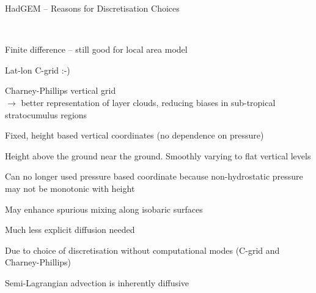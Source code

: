 \begin{slide}{HadGEM -- Reasons for Discretisation Choices}

\ \\
\begin{list1}

\item Finite difference -- still good for local area model

\item Lat-lon C-grid :-)

\item Charney-Phillips vertical grid\\
$\rightarrow$ better representation of layer clouds, reducing biases in sub-tropical stratocumulus regions

\item Fixed, height based vertical coordinates (no dependence on pressure)
\begin{list2}
\item Height above the ground near the ground. Smoothly varying to flat vertical levels
\item Can no longer used pressure based coordinate because non-hydrostatic pressure may not be monotonic with height
\item May enhance spurious mixing along isobaric surfaces
\end{list2}

\item Much less explicit diffusion needed
\begin{list2}
\item Due to choice of discretisation without computational modes (C-grid and Charney-Phillips)
\item Semi-Lagrangian advection is inherently diffusive
\end{list2}

\end{list1}
\end{slide}

